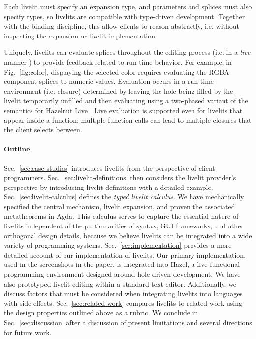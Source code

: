  Each livelit must specify an expansion type,
and parameters and splices must also specify types,
so livelits are compatible with type-driven development.
Together with the binding discipline,
this allow clients to reason abstractly, i.e.
without inspecting the expansion or livelit implementation.

 Uniquely, livelits can evaluate splices
  throughout the editing process
  (i.e. in a \emph{live} manner \cite{DBLP:conf/icse/Tanimoto13})
  to provide feedback related to run-time behavior.
  For example, in Fig.~\ref{fig:color},
  displaying the selected color requires evaluating the RGBA
  component splices to numeric values.
  Evaluation occurs in a run-time environment (i.e. closure) determined by
  leaving the hole being filled by the livelit temporarily unfilled and then evaluating
  using a two-phased variant of the semantics for
  Hazelnut Live \cite{HazelnutLive}.
  Live evaluation is supported even for livelits
  that appear inside a function: multiple function calls
  can lead
  to multiple closures that the client
   selects between.

\paragraph{Outline.} Sec.~\ref{sec:case-studies} introduces
livelits from the perspective of client programmers.
Sec.~\ref{sec:livelit-definitions} then
considers the livelit provider's perspective by introducing livelit
definitions with a detailed example.
Sec.~\ref{sec:livelit-calculus} defines the \emph{typed livelit calculus}.
We have mechanically specified the central mechanism, livelit expansion,
and proven the associated metatheorems in Agda.
This calculus
serves to capture the essential nature of livelits
independent of the particularities of syntax, GUI frameworks,
and other orthogonal design details,
because we believe livelits can be integrated into a wide variety of programming systems.
Sec.~\ref{sec:implementation} provides a more detailed account of our implementation of livelits.
Our primary implementation, used in the screenshots in the paper,
is integrated into Hazel, a live functional programming environment designed
around hole-driven development.
We have also prototyped livelit editing within a standard text editor.
Additionally, we discuss factors that must be considered when integrating livelits into languages with side effects.
Sec.~\ref{sec:related-work} compares livelits to related work using the design properties outlined above
as a rubric.
We conclude in Sec.~\ref{sec:discussion} after a discussion of present limitations and several directions for future work.